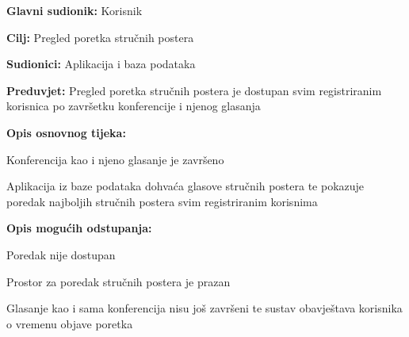 				
				\noindent {}
				\begin{packed_item}
					
					\item \textbf{Glavni sudionik: }Korisnik
					\item  \textbf{Cilj:} Pregled poretka stručnih postera
					\item  \textbf{Sudionici:} Aplikacija i baza podataka
					\item  \textbf{Preduvjet:} Pregled poretka stručnih postera je dostupan svim registriranim korisnica po završetku konferencije i njenog glasanja
					\item  \textbf{Opis osnovnog tijeka:}
					
					\item[] \begin{packed_enum}
						
						\item Konferencija kao i njeno glasanje je završeno
						\item Aplikacija iz baze podataka dohvaća glasove stručnih postera te pokazuje poredak najboljih stručnih postera svim registriranim korisnima 
					\end{packed_enum}
					
					\item  \textbf{Opis mogućih odstupanja:}
					
					\item[] \begin{packed_item}
						
						\item[2.a] Poredak nije dostupan
						\item[] \begin{packed_enum}
							
							\item Prostor za poredak stručnih postera je prazan
							\item Glasanje kao i sama konferencija nisu još završeni te sustav obavještava korisnika o vremenu objave poretka
							
						\end{packed_enum}
				
						
					\end{packed_item}
				\end{packed_item}
				
				
				
